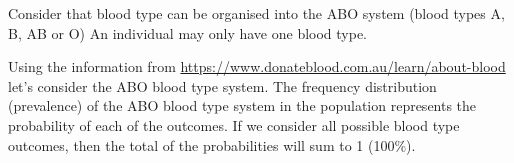 \documentclass[
]{memoir}
\begin{document}
Consider that blood type can be organised into the ABO system (blood types A, B, AB or O) An individual may only have one blood type.

Using the information from \url{https://www.donateblood.com.au/learn/about-blood} let's consider the ABO blood type system. The frequency distribution (prevalence) of the ABO blood type system in the population represents the probability of each of the outcomes. If we consider all possible blood type outcomes, then the total of the probabilities will sum to 1 (100\%).

 
  \providecommand{\huxb}[2]{\arrayrulecolor[RGB]{#1}\global\arrayrulewidth=#2pt}
  \providecommand{\huxvb}[2]{\color[RGB]{#1}\vrule width #2pt}
  \providecommand{\huxtpad}[1]{\rule{0pt}{#1}}
  \providecommand{\huxbpad}[1]{\rule[-#1]{0pt}{#1}}
\end{document}
